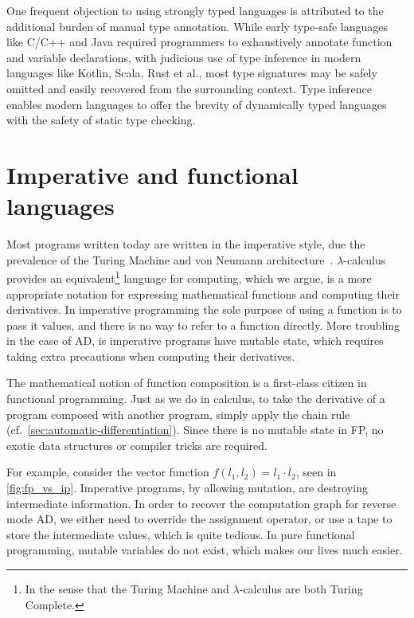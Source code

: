 \documentclass[12pt,initial,twoside,maitrise]{dms}
\numberwithin{equation}{section}
\numberwithin{table}{chapter}
\numberwithin{figure}{chapter}
\begin{document}
One frequent objection to using strongly typed languages is attributed to the additional burden of manual type annotation. While early type-safe languages like C/C++ and Java required programmers to exhaustively annotate function and variable declarations, with judicious use of type inference in modern languages like Kotlin, Scala, Rust et al., most type signatures may be safely omitted and easily recovered from the surrounding context. Type inference enables modern languages to offer the brevity of dynamically typed languages with the safety of static type checking.

\section{Imperative and functional languages}

Most programs written today are written in the imperative style, due the prevalence of the Turing Machine and von Neumann architecture~\citep{backus2007can}. $\lambda$-calculus provides an equivalent\footnote{In the sense that the Turing Machine and $\lambda$-calculus are both Turing Complete.} language for computing, which we argue, is a more appropriate notation for expressing mathematical functions and computing their derivatives. In imperative programming the sole purpose of using a function is to pass it values, and there is no way to refer to a function directly. More troubling in the case of AD, is imperative programs have mutable state, which requires taking extra precautions when computing their derivatives.

The mathematical notion of function composition is a first-class citizen in functional programming. Just as we do in calculus, to take the derivative of a program composed with another program, simply apply the chain rule (cf.~\autoref{sec:automatic-differentiation}). Since there is no mutable state in FP, no exotic data structures or compiler tricks are required.

For example, consider the vector function $f(l_1, l_2) = l_1 \cdot l_2$, seen in \autoref{fig:fp_vs_ip}. Imperative programs, by allowing mutation, are destroying intermediate information. In order to recover the computation graph for reverse mode AD, we either need to override the assignment operator, or use a tape to store the intermediate values, which is quite tedious. In pure functional programming, mutable variables do not exist, which makes our lives much easier.
\end{document}
